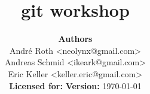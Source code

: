 \documentclass[t,10pt]{beamer}
\begin{document}
\title{git workshop}
\author{
  \textbf{Authors} \\
  André Roth \textless{}neolynx@gmail.com\textgreater{}\\
  Andreas Schmid \textless{}ikeark@gmail.com\textgreater{}\\
  Eric Keller \textless{}keller.eric@gmail.com\textgreater{}\\
  \vspace{.4em}
  \textbf{Licensed for:} 
  \textbf{Version:} \today
}

\frame{\titlepage}


\end{document}
